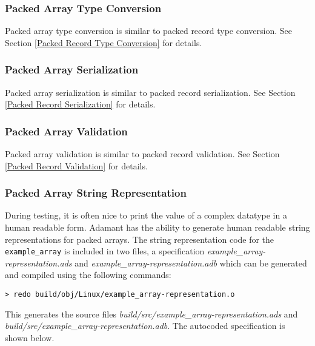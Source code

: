 \subsubsection{Packed Array Type Conversion}

Packed array type conversion is similar to packed record type conversion. See Section \ref{Packed Record Type Conversion} for details.

\subsubsection{Packed Array Serialization}

Packed array serialization is similar to packed record serialization. See Section \ref{Packed Record Serialization} for details.

\subsubsection{Packed Array Validation}

Packed array validation is similar to packed record validation. See Section \ref{Packed Record Validation} for details.

\subsubsection{Packed Array String Representation}

During testing, it is often nice to print the value of a complex datatype in a human readable form. Adamant has the ability to generate human readable string representations for packed arrays. The string representation code for the \texttt{example\_array} is included in two files, a specification \textit{example\_array-representation.ads} and \textit{example\_array-representation.adb} which can be generated and compiled using the following commands: 

\vspace{5mm} %
\begin{verbatim}
> redo build/obj/Linux/example_array-representation.o
\end{verbatim}
\vspace{5mm} %

This generates the source files \textit{build/src/example\_array-representation.ads} and \textit{build/src/example\_array-representation.adb}. The autocoded specification is shown below.


